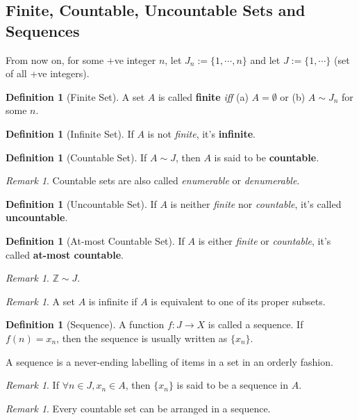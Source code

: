 \documentclass[a4paper,12pt]{report}
\newcommand{\Z}{\mathbb{Z}}
\newcommand{\tb}{\textbf}
\theoremstyle{plain}
\theoremstyle{definition}
\newtheorem{definition}[theorem]{\color{red}Definition} %
\theoremstyle{remark}
\newtheorem{remark}[theorem]{\color{ForestGreen}Remark} %
\begin{document}
\subsection{Finite, Countable, Uncountable Sets and Sequences}
\noindent From now on, for some +ve integer $n$, let $J_n:=\{1,\cdots,n\}$ and let $J:=\{1,\cdots\}$ (set of all +ve integers).
\begin{definition}[Finite Set]
A set $A$ is called \tb{finite} \emph{iff} (a) $A=\emptyset$ or (b) $A\sim J_n$ for some $n$.
\end{definition}
\begin{definition}[Infinite Set]
If $A$ is not \emph{finite}, it's \tb{infinite}.
\end{definition}
\begin{definition}[Countable Set]
If $A\sim J$, then $A$ is said to be \tb{countable}.
\end{definition}
\begin{remark}
Countable sets are also called \emph{enumerable} or \emph{denumerable}.
\end{remark}
\begin{definition}[Uncountable Set]
If $A$ is neither \emph{finite} nor \emph{countable}, it's called \tb{uncountable}.
\end{definition}
\begin{definition}[At-most Countable Set]
If $A$ is either \emph{finite} or \emph{countable}, it's called \tb{at-most countable}.
\end{definition}
\begin{remark}
$\Z\sim J$.
\end{remark}
\begin{remark}
A set $A$ is infinite if $A$ is equivalent to one of its proper subsets.
\end{remark}
\begin{definition}[Sequence]
A function $f:J\to X$ is called a sequence. If $f(n)=x_n$, then the sequence is usually written as $\{x_n\}$.
\end{definition}
\begin{insight}
A sequence is a never-ending labelling of items in a set in an orderly fashion.
\end{insight}
\begin{remark}
If $\forall n\in J, x_n\in A$, then $\{x_n\}$ is said to be a sequence in $A$.
\end{remark}
\begin{remark}
Every countable set can be arranged in a sequence.
\end{remark}
\end{document}
